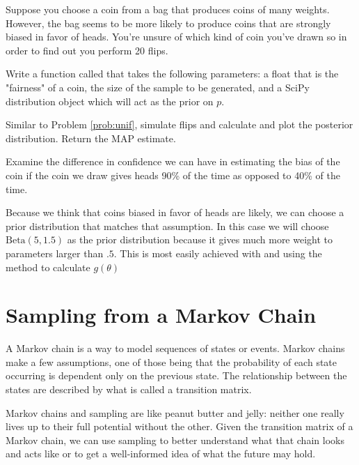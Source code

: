 \begin{problem}
  Suppose you choose a coin from a bag that produces coins of many weights.
  However, the bag seems to be more likely to produce coins that are strongly biased in favor of heads.
  You're unsure of which kind of coin you've drawn so in order to find out you perform 20 flips.

  Write a function called  that takes the following parameters:  a float that is the "fairness" of a coin,  the size of the sample to be generated, and  a SciPy distribution object which will act as the prior on $p$.

  Similar to Problem \ref{prob:unif}, simulate  flips and calculate and plot the posterior distribution. 
  Return the MAP estimate.

  Examine the difference in confidence we can have in estimating the bias of the coin if the coin we draw gives heads 90\% of the time as opposed to 40\% of the time.

  Because we think that coins biased in favor of heads are likely, we can choose a prior distribution that matches that assumption. 
  In this case we will choose $\text{Beta}(5,1.5)$ as the prior distribution because it gives much more weight to parameters larger than $.5$.
  This is most easily achieved with  and using the  method to calculate $g(\theta)$
\end{problem}


\section*{Sampling from a Markov Chain}
A Markov chain is a way to model sequences of states or events.
Markov chains make a few assumptions, one of those being that the probability of each state occurring is dependent only on the previous state.
The relationship between the states are described by what is called a transition matrix.

Markov chains and sampling are like peanut butter and jelly: neither one really lives up to their full potential without the other. 
Given the transition matrix of a Markov chain, we can use sampling to better understand what that chain looks and acts like or to get a well-informed idea of what the future may hold.

